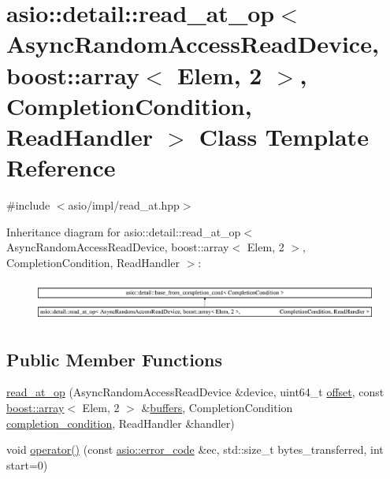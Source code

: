 \hypertarget{classasio_1_1detail_1_1read__at__op_3_01_async_random_access_read_device_00_01boost_1_1array_3_00756f1b0c223a71b75bb1b3f8c0f0e31}{}\section{asio\+:\+:detail\+:\+:read\+\_\+at\+\_\+op$<$ Async\+Random\+Access\+Read\+Device, boost\+:\+:array$<$ Elem, 2 $>$, Completion\+Condition, Read\+Handler $>$ Class Template Reference}
\label{classasio_1_1detail_1_1read__at__op_3_01_async_random_access_read_device_00_01boost_1_1array_3_00756f1b0c223a71b75bb1b3f8c0f0e31}


{\ttfamily \#include $<$asio/impl/read\+\_\+at.\+hpp$>$}

Inheritance diagram for asio\+:\+:detail\+:\+:read\+\_\+at\+\_\+op$<$ Async\+Random\+Access\+Read\+Device, boost\+:\+:array$<$ Elem, 2 $>$, Completion\+Condition, Read\+Handler $>$\+:\begin{figure}[H]
\begin{center}
\leavevmode
\includegraphics[height=1.325444cm]{classasio_1_1detail_1_1read__at__op_3_01_async_random_access_read_device_00_01boost_1_1array_3_00756f1b0c223a71b75bb1b3f8c0f0e31}
\end{center}
\end{figure}
\subsection*{Public Member Functions}
\begin{DoxyCompactItemize}
\item 
\hyperlink{classasio_1_1detail_1_1read__at__op_3_01_async_random_access_read_device_00_01boost_1_1array_3_00756f1b0c223a71b75bb1b3f8c0f0e31_a8b19ed0d3895ca487ec9b03454d73f8c}{read\+\_\+at\+\_\+op} (Async\+Random\+Access\+Read\+Device \&device, uint64\+\_\+t \hyperlink{group__async__read__at_ga8dcdb41a4adfd6fe5322b5dd666d9f29}{offset}, const \hyperlink{classboost_1_1array}{boost\+::array}$<$ Elem, 2 $>$ \&\hyperlink{group__async__read_ga54dede45c3175148a77fe6635222c47d}{buffers}, Completion\+Condition \hyperlink{group__async__read_gae2e215d5013596cc2b385bb6c13fa518}{completion\+\_\+condition}, Read\+Handler \&handler)
\item 
void \hyperlink{classasio_1_1detail_1_1read__at__op_3_01_async_random_access_read_device_00_01boost_1_1array_3_00756f1b0c223a71b75bb1b3f8c0f0e31_aa7fcd903e20599176d4b4ff4f9ea1f87}{operator()} (const \hyperlink{classasio_1_1error__code}{asio\+::error\+\_\+code} \&ec, std\+::size\+\_\+t bytes\+\_\+transferred, int start=0)
\end{DoxyCompactItemize}

